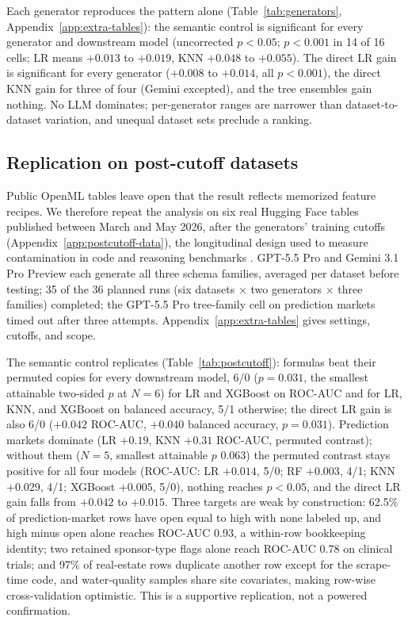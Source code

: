 Each generator reproduces the pattern alone (Table~\ref{tab:generators}, Appendix~\ref{app:extra-tables}): the semantic control is significant for every generator and downstream model (uncorrected \(p < 0.05\); \(p < 0.001\) in 14 of 16 cells; LR means \(+0.013\) to \(+0.019\), KNN \(+0.048\) to \(+0.055\)). The direct LR gain is significant for every generator (\(+0.008\) to \(+0.014\), all \(p < 0.001\)), the direct KNN gain for three of four (Gemini excepted), and the tree ensembles gain nothing. No LLM dominates; per-generator ranges are narrower than dataset-to-dataset variation, and unequal dataset sets preclude a ranking.

\subsection{Replication on post-cutoff datasets}\label{sec:postcutoff}

Public OpenML tables leave open that the result reflects memorized feature recipes. We therefore repeat the analysis on six real Hugging Face tables published between March and May 2026, after the generators' training cutoffs (Appendix~\ref{app:postcutoff-data}), the longitudinal design used to measure contamination in code and reasoning benchmarks \citep{roberts2024cutoff,white2025livebench}. GPT-5.5 Pro and Gemini 3.1 Pro Preview each generate all three schema families, averaged per dataset before testing; 35 of the 36 planned runs (six datasets \(\times\) two generators \(\times\) three families) completed; the GPT-5.5 Pro tree-family cell on prediction markets timed out after three attempts. Appendix~\ref{app:extra-tables} gives settings, cutoffs, and scope.

The semantic control replicates (Table~\ref{tab:postcutoff}): formulas beat their permuted copies for every downstream model, 6/0 (\(p = 0.031\), the smallest attainable two-sided \(p\) at \(N = 6\)) for LR and XGBoost on ROC-AUC and for LR, KNN, and XGBoost on balanced accuracy, 5/1 otherwise; the direct LR gain is also 6/0 (\(+0.042\) ROC-AUC, \(+0.040\) balanced accuracy, \(p = 0.031\)). Prediction markets dominate (LR \(+0.19\), KNN \(+0.31\) ROC-AUC, permuted contrast); without them (\(N = 5\), smallest attainable \(p\) 0.063) the permuted contrast stays positive for all four models (ROC-AUC: LR \(+0.014\), 5/0; RF \(+0.003\), 4/1; KNN \(+0.029\), 4/1; XGBoost \(+0.005\), 5/0), nothing reaches \(p < 0.05\), and the direct LR gain falls from \(+0.042\) to \(+0.015\). Three targets are weak by construction: 62.5\% of prediction-market rows have open equal to high with none labeled up, and high minus open alone reaches ROC-AUC 0.93, a within-row bookkeeping identity; two retained sponsor-type flags alone reach ROC-AUC 0.78 on clinical trials; and 97\% of real-estate rows duplicate another row except for the scrape-time code, and water-quality samples share site covariates, making row-wise cross-validation optimistic. This is a supportive replication, not a powered confirmation.

